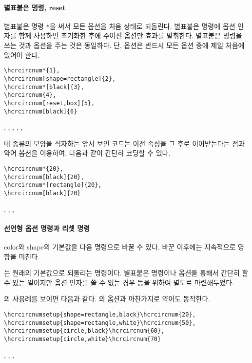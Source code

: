 \paragraph{별표붙은 명령, reset}
별표붙은 명령 \texttt{*}을 써서 모든 옵션을 처음 상태로 되돌린다.
별표붙은 명령에 옵션 인자를 함께 사용하면 초기화한 후에 주어진 옵션만 효과를 발휘한다.
별표붙은 명령을 쓰는 것과  옵션을 주는 것은 동일하다.
단,  옵션은 반드시 모든 옵션 중에 제일 처음에 있어야 한다.
\begin{verbatim}
\hcrcircnum*{1},
\hcrcircnum[shape=rectangle]{2},
\hcrcircnum*[black]{3},
\hcrcircnum{4},
\hcrcircnum[reset,box]{5},
\hcrcircnum[black]{6}
\end{verbatim}
,
,
,
,
,

\medskip

네 종류의 모양을 식자하는 앞서 보인 코드는 이전 속성을 그 후로 이어받는다는 점과 약어 옵션을 이용하여, 다음과 같이 간단히 코딩할 수 있다.
\begin{verbatim}
\hcrcircnum*{20},
\hcrcircnum[black]{20},
\hcrcircnum*[rectangle]{20},
\hcrcircnum[black]{20}
\end{verbatim}
,
,
,


\paragraph{선언형 옵션 명령과 리셋 명령}
color와 shape의 기본값을 다음 명령으로 바꿀 수 있다. 바꾼 이후에는 지속적으로 영향을 미친다.
\begin{boxedverbatim}
\restorehcrcircnumsetup
\end{boxedverbatim}
는 원래의 기본값으로 되돌리는 명령이다.
별표붙은 명령이나  옵션을 통해서 간단히 할 수 있는 일이지만 옵션 인자를 쓸 수 없는 경우 등을 위하여 별도로 마련해두었다.
 
의 사용례를 보이면 다음과 같다. 의 옵션과 마찬가지로 약어도 동작한다.
\begin{verbatim}
\hcrcircnumsetup{shape=rectangle,black}\hcrcircnum{20},
\hcrcircnumsetup{shape=rectangle,white}\hcrcircnum{50},
\hcrcircnumsetup{circle,black}\hcrcircnum{60},
\hcrcircnumsetup{circle,white}\hcrcircnum{70}
\end{verbatim}
,
,
,

\endinput